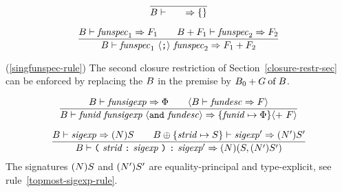 \vspace{6pt}
\begin{equation}        %
\frac{}
     { \B\ts\emptyfunspec\ra\emptymap }
\end{equation}

\vspace{6pt}
\begin{equation}        %
\frac{ \B\ts\funspec_1\ra\F_1\qquad
       \B+\F_1\ts\funspec_2\ra\F_2 }
     { \B\ts\seqfunspec\ra\plusmap{\F_1}{\F_2} }
\end{equation}
\comments
\begin{description}
\item{(\ref{singfunspec-rule})}
The second closure restriction of Section~\ref{closure-restr-sec}
can be enforced by replacing the $B$ in the premise by $B_0+G \mathbin{\rm of} B$.
\end{description}
\begin{equation}        %
\frac{ \B\ts\funsigexp\ra\funsig\qquad
       \langle\B\ts\fundesc\ra\F\rangle}
     { \B\ts\longfundesc\ra\{\funid\mapsto\funsig\}
       \langle +\ \F\rangle}\index{44.3}
\end{equation}

\begin{equation}	%
\label{funsigexp-rule}
\frac{\B\ts\sigexp\ra(\N)\S\qquad
      \B\oplus\{\strid\mapsto\S\}\ts\sigexp'\ra(\N')\S'}
     {\B\ts\longfunsigexpa\ra(N)(S,(N')S')}\index{44.4}
\end{equation}
\comment
The signatures $(N)S$ and $(N')S'$ are equality-principal 
and type-explicit, see rule~\ref{topmost-sigexp-rule}.

